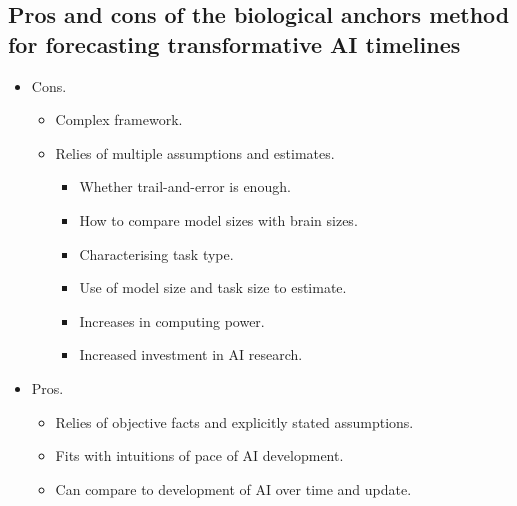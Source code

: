 \subsection{Pros and cons of the biological anchors method for forecasting transformative AI timelines}

\begin{itemize}
    \item Cons.
    \begin{itemize}
        \item Complex framework.
        \item Relies of multiple assumptions and estimates.
        \begin{itemize}
            \item Whether trail-and-error is enough.
            \item How to compare model sizes with brain sizes.
            \item Characterising task type.
            \item Use of model size and task size to estimate.
            \item Increases in computing power.
            \item Increased investment in AI research.
        \end{itemize}
    \end{itemize}
    \item Pros.
    \begin{itemize}
        \item Relies of objective facts and explicitly stated assumptions.
        \item Fits with intuitions of pace of AI development.
        \item Can compare to development of AI over time and update.
    \end{itemize}
\end{itemize}